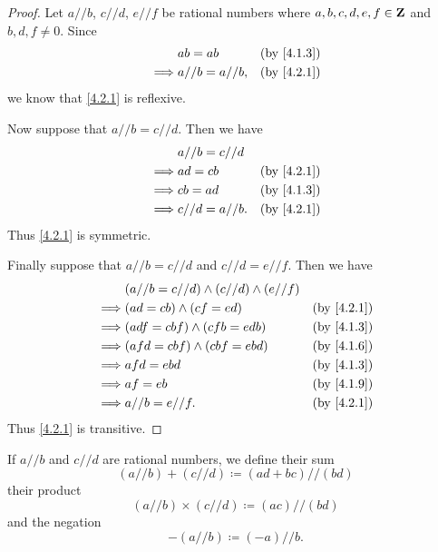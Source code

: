 \begin{proof}
  Let \(a // b\), \(c // d\), \(e // f\) be rational numbers where \(a, b, c, d, e, f \in \mathbf{Z}\) and \(b, d, f \neq 0\).
  Since
  \begin{align*}
             & ab = ab          & \text{(by \cref{4.1.3})} \\
    \implies & a // b = a // b, & \text{(by \cref{4.2.1})}
  \end{align*}
  we know that \cref{4.2.1} is reflexive.

  Now suppose that \(a // b = c // d\).
  Then we have
  \begin{align*}
             & a // b = c // d                             \\
    \implies & ad = cb          & \text{(by \cref{4.2.1})} \\
    \implies & cb = ad          & \text{(by \cref{4.1.3})} \\
    \implies & c // d = a // b. & \text{(by \cref{4.2.1})}
  \end{align*}
  Thus \cref{4.2.1} is symmetric.

  Finally suppose that \(a // b = c // d\) and \(c // d = e // f\).
  Then we have
  \begin{align*}
             & (a // b = c // d) \land (c // d) \land (e // f)                            \\
    \implies & (ad = cb) \land (cf = ed)                       & \text{(by \cref{4.2.1})} \\
    \implies & (adf = cbf) \land (cfb = edb)                   & \text{(by \cref{4.1.3})} \\
    \implies & (afd = cbf) \land (cbf = ebd)                   & \text{(by \cref{4.1.6})} \\
    \implies & afd = ebd                                       & \text{(by \cref{4.1.3})} \\
    \implies & af = eb                                         & \text{(by \cref{4.1.9})} \\
    \implies & a // b = e // f.                                & \text{(by \cref{4.2.1})}
  \end{align*}
  Thus \cref{4.2.1} is transitive.
\end{proof}

\begin{definition}\label{4.2.2}
  If \(a // b\) and \(c // d\) are rational numbers, we define their sum
  \[
    (a // b) + (c // d) \coloneqq (ad + bc) // (bd)
  \]
  their product
  \[
    (a // b) \times (c // d) \coloneqq (ac) // (bd)
  \]
  and the negation
  \[
    -(a // b) \coloneqq (-a) // b.
  \]
\end{definition}

